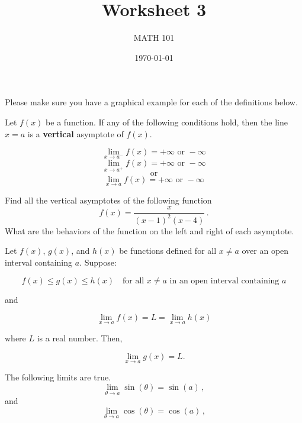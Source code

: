 \documentclass[12pt]{amsart}
\title{ Worksheet 3 }
\author{MATH 101}
\date{\today}
\begin{document}
\maketitle

Please make sure you have a graphical example for each of the definitions below.

\begin{definition}
	Let \( f(x) \) be a function. If any of the following conditions hold, then the line \( x = a \) is a \textbf{vertical} asymptote of \( f(x) \).

	\[
		\lim_{x \to a^-} f(x) = +\infty \text{ or } -\infty
	\]
	\[
		\lim_{x \to a^+} f(x) = +\infty \text{ or } -\infty
	\]
	\[
		\text{or}
	\]
	\[
		\lim_{x \to a} f(x) = +\infty \text{ or } -\infty
	\]
\end{definition}


\begin{question}
	Find all the vertical asymptotes of the following function
	\begin{equation*}
		f(x) = \frac{x}{(x-1)^2 (x-4)} \,.
	\end{equation*}
	What are the behaviors  of the function on the left and right of each asymptote.
\end{question}
\vspace{5cm}


\begin{theorem}
	Let \( f(x) \), \( g(x) \), and \( h(x) \) be functions defined for all \( x \neq a \) over an open interval containing \( a \). Suppose:

	\[
		f(x) \leq g(x) \leq h(x) \quad \text{for all } x \neq a \text{ in an open interval containing } a
	\]

	and

	\[
		\lim_{x \to a} f(x) = L = \lim_{x \to a} h(x)
	\]

	where \( L \) is a real number. Then,

	\[
		\lim_{x \to a} g(x) = L.
	\]
\end{theorem}

\begin{theorem}
	The following limits are true.
	\begin{equation*}
		\lim_{\theta \to a} \sin(\theta) = \sin(a) \,,
	\end{equation*}
	and
	\begin{equation*}
		\lim_{\theta \to a} \cos(\theta) = \cos(a) \,,
	\end{equation*}
\end{theorem}
\end{document}
